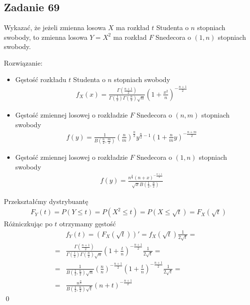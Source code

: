 \subsection*{Zadanie 69}
Wykazać, że jeżeli zmienna losowa $ X $ ma rozkład $ t $ Studenta o $ n $ stopniach swobody, to zmienna losowa $ Y=X^2 $  ma rozkład $ F $ Snedecora o $ (1,n) $ stopniach swobody.

Rozwiązanie:
\begin{itemize}
\item Gęstość rozkładu $ t $ Studenta o $ n $ stopniach swobody
\begin{gather*}
f_X(x)=
\frac{\Gamma\left(\frac{n+1}{2}\right)}{\Gamma\left(\frac{1}{2}\right)\Gamma\left(\frac{n}{2}\right)\sqrt n}\left(1+\frac{x^2}{n}\right)^{-\frac{n+1}{2}}
\end{gather*}
\item Gęstość zmiennej losowej o rozkładzie $ F $ Snedecora o $ (n,m) $ stopniach swobody
\begin{gather*}
f(y)=\frac{1}{B \left(\frac{n}{2},\frac{m}{2}\right)}\left(\frac{n}{m}\right)^\frac{n}{2}y^{\frac{n}{2}-1}\left(1+\frac{n}{m}y\right)^{-\frac{n+m}{2}}
\end{gather*}
\item Gęstość zmiennej losowej o rozkładzie $ F $ Snedecora o $ (1,n) $ stopniach swobody
\begin{gather*}
f(y)=
\frac{n^{\frac{n}{2}} (n+x)^{-\frac{n+1}{2}}}
{\sqrt{x}B\left(\frac{1}{2},\frac{n}{2}\right)}
\end{gather*}
\end{itemize}
Przekształćmy dystrybuantę
\begin{align*}
&F_Y(t)=
P\left(Y\le t\right)=
P\left(X^2\le t\right)=
P\left(X\le \sqrt t\right)=F_X\left(\sqrt t\right)
\end{align*}
Różniczkując po $ t $ otrzymamy gęstość
\begin{align*}
&f_Y(t)=\left(F_X\left(\sqrt t\right)\right)'=
f_X\left(\sqrt t\right)
\frac{1}{2\sqrt t}
=\\=&
\frac{\Gamma\left(\frac{n+1}{2}\right)}{\Gamma\left(\frac{1}{2}\right)\Gamma\left(\frac{n}{2}\right)\sqrt n}\left(1+\frac{t}{n}\right)^{-\frac{n+1}{2}}
\frac{1}{2\sqrt t}
=\\=&
\frac{1}{B\left(\frac{1}{2},\frac{n}{2}\right)\sqrt n}
\left(\frac{n}{n}\right)^{-\frac{n+1}{2}}
\left(1+\frac{t}{n}\right)^{-\frac{n+1}{2}}
\frac{1}{2\sqrt t}
=\\=&
\frac{n^\frac{n}{2}}{B\left(\frac{1}{2},\frac{n}{2}\right)\sqrt t}
\left(n+t\right)^{-\frac{n+1}{2}}
\end{align*}\qed

